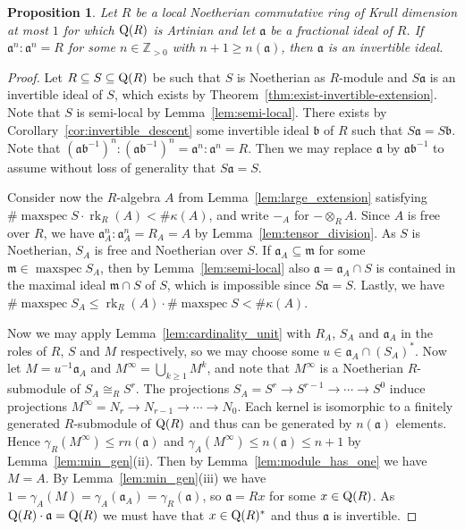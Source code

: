 \documentclass{amsart}
\theoremstyle{plain}
\newtheorem{proposition}[theorem]{Proposition}
\theoremstyle{definition}
\DeclareMathOperator{\rk}{rk}
\DeclareMathOperator{\maxspec}{maxspec}
\newcommand{\tensor}{\otimes}
\newcommand{\Z}{\ensuremath{\mathbb{Z}}}
\begin{document}
\begin{proposition}\label{prop:local_case}
Let \(R\) be a local Noetherian commutative ring of Krull dimension at most \(1\) for which \(\textup{Q}(R)\) is Artinian and let \(\mathfrak{a}\) be a fractional ideal of \(R\). If \(\mathfrak{a}^{n}:\mathfrak{a}^{n}=R\) for some \(n\in\Z_{>0}\) with \(n+1\geq n(\mathfrak{a})\), then \(\mathfrak{a}\) is an invertible ideal.
\end{proposition}
\begin{proof}
Let \(R\subseteq S\subseteq\textup{Q}(R)\) be such that \(S\) is Noetherian as \(R\)-module and \(S\mathfrak{a}\) is an invertible ideal of \(S\), which exists by Theorem~\ref{thm:exist-invertible-extension}. 
Note that \(S\) is semi-local by Lemma~\ref{lem:semi-local}.
There exists by Corollary~\ref{cor:invertible_descent} some invertible ideal \(\mathfrak{b}\) of \(R\) such that \(S\mathfrak{a} = S\mathfrak{b}\).
Note that \((\mathfrak{a}\mathfrak{b}^{-1})^n:(\mathfrak{a}\mathfrak{b}^{-1})^n=\mathfrak{a}^n:\mathfrak{a}^n=R\).
Then we may replace \(\mathfrak{a}\) by \(\mathfrak{a}\mathfrak{b}^{-1}\) to assume without loss of generality that \(S\mathfrak{a} = S\).

Consider now the \(R\)-algebra \(A\) from Lemma~\ref{lem:large_extension} satisfying  \(\#\maxspec S \cdot \rk_R(A) <\#\kappa(A)\), and write \(-_A\) for \(-\tensor_R A\). 
Since \(A\) is free over \(R\), we have \(\mathfrak{a}^{n}_A:\mathfrak{a}^{n}_A=R_A=A\) by Lemma~\ref{lem:tensor_division}. 
As \(S\) is Noetherian, \(S_A\) is free and Noetherian over \(S\).
If \(\mathfrak{a}_A\subseteq \mathfrak{m}\) for some \(\mathfrak{m}\in\maxspec S_A\), then by Lemma~\ref{lem:semi-local} also \(\mathfrak{a}=\mathfrak{a}_A\cap S\) is contained in the maximal ideal \(\mathfrak{m}\cap S\) of \(S\), which is impossible since \(S\mathfrak{a} = S\). 
Lastly, we have \(\#\maxspec S_A \leq \rk_R(A) \cdot \#\maxspec S < \#\kappa(A)\).

Now we may apply Lemma~\ref{lem:cardinality_unit} with \(R_A\), \(S_A\) and \(\mathfrak{a}_A\) in the roles of \(R\), \(S\) and \(M\) respectively, so we may choose some \(u\in \mathfrak{a}_A\cap (S_A)^*\).
Now let \(M=u^{-1} \mathfrak{a}_A\) and \(M^\infty=\bigcup_{k\geq 1} M^k\), and note that \(M^\infty\) is a Noetherian \(R\)-submodule of \(S_A\cong_R S^r\).
The projections \(S_A=S^r\to S^{r-1}\to\dotsm\to S^0\) induce projections \(M^\infty=N_r\to N_{r-1}\to\dotsm\to N_0\). 
Each kernel is isomorphic to a finitely generated \(R\)-submodule of \(\textup{Q}(R)\) and thus can be generated by \(n(\mathfrak{a})\) elements. 
Hence \(\gamma_R(M^\infty)\leq r n(\mathfrak{a})\) and \(\gamma_A(M^\infty)\leq n(\mathfrak{a})\leq n+1\) by Lemma~\ref{lem:min_gen}(ii).
Then by Lemma~\ref{lem:module_has_one} we have \(M=A\).
By Lemma~\ref{lem:min_gen}(iii) we have \(1=\gamma_A(M)=\gamma_A(\mathfrak{a}_A)=\gamma_R(\mathfrak{a})\), so \(\mathfrak{a}=Rx\) for some \(x\in\textup{Q}(R)\). 
As \(\textup{Q}(R)\cdot \mathfrak{a}=\textup{Q}(R)\) we must have that \(x\in\textup{Q}(R)^*\) and thus \(\mathfrak{a}\) is invertible.
\end{proof}
\end{document}
